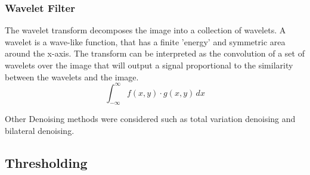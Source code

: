 \documentclass[a4paper]{article}
\begin{document}
\begin{multicols}{2}
    \subsubsection{Wavelet Filter}
    The wavelet transform decomposes the image into a collection of wavelets. A wavelet is a wave-like function, that has a finite 'energy' and symmetric area around the x-axis. The transform can be interpreted as the convolution of a set of wavelets over the image that will output a signal proportional to the similarity between the wavelets and the image.
    \[ \int_{-\infty}^{\infty} f(x,y) \cdot g(x,y) \,dx \]

    \par
    Other Denoising methods were considered such as total variation denoising and bilateral denoising.

    \subsection{Thresholding}



    \newpage
    \printbibliography
\end{multicols}
\end{document}

